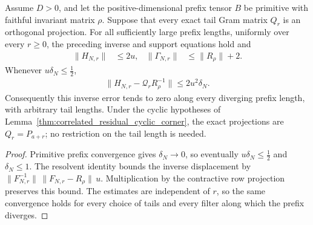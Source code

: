 \begin{lemma}
    \label{thm:residual_supported_inverse_uniform_tail}
    \leanok
    Assume $D>0$, and let the positive-dimensional prefix tensor $B$ be
    primitive with faithful invariant matrix $\rho$. Suppose that every exact tail Gram matrix $Q_r$
    is an orthogonal projection. For all sufficiently large prefix lengths,
    uniformly over every $r\geq0$, the preceding inverse and support equations
    hold and
    \begin{align}
        \|H_{N,r}\|      & \leq2u,           &
        \|\Gamma_{N,r}\| & \leq\|R_\rho\|+2.
    \end{align}
    Whenever $u\delta_N\leq\tfrac12$,
    \begin{align}
        \|H_{N,r}-\mathcal Q_rR_\rho^{-1}\|\leq2u^2\delta_N.
    \end{align}
    Consequently this inverse error tends to zero along every diverging
    prefix length, with arbitrary tail lengths. Under the cyclic hypotheses
    of Lemma~\ref{thm:correlated_residual_cyclic_corner}, the exact projections
    are $Q_r=P_{a+r}$; no restriction on the tail length is needed.
\end{lemma}
\begin{proof}\leanok
    Primitive prefix convergence gives $\delta_N\to0$, so eventually
    $u\delta_N\leq\tfrac12$ and $\delta_N\leq1$.
    The resolvent identity bounds the inverse displacement by
    $\|F_{N,r}^{-1}\|\,\|F_{N,r}-R_\rho\|\,u$.
    Multiplication by the contractive row projection preserves this bound.
    The estimates are independent of $r$, so the same convergence holds
    for every choice of tails and every filter along which the prefix
    diverges.
\end{proof}

